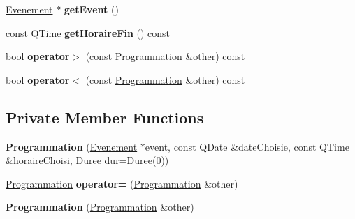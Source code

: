 \begin{DoxyCompactItemize}
\item 
\hypertarget{class_programmation_afdb51dc8924974a73bc750096ae0151c}{}\hyperlink{class_evenement}{Evenement} $\ast$ {\bfseries get\+Event} ()\label{class_programmation_afdb51dc8924974a73bc750096ae0151c}

\item 
\hypertarget{class_programmation_a8a8e262d61a00c2e2d46c1aad7c895ff}{}const Q\+Time {\bfseries get\+Horaire\+Fin} () const \label{class_programmation_a8a8e262d61a00c2e2d46c1aad7c895ff}

\item 
\hypertarget{class_programmation_ae5e3c4dc5b6310e1b054a64b3eaee5fe}{}bool {\bfseries operator$>$} (const \hyperlink{class_programmation}{Programmation} \&other) const \label{class_programmation_ae5e3c4dc5b6310e1b054a64b3eaee5fe}

\item 
\hypertarget{class_programmation_a47bd954f67af45e8543efe792be05395}{}bool {\bfseries operator$<$} (const \hyperlink{class_programmation}{Programmation} \&other) const \label{class_programmation_a47bd954f67af45e8543efe792be05395}

\end{DoxyCompactItemize}
\subsection*{Private Member Functions}
\begin{DoxyCompactItemize}
\item 
\hypertarget{class_programmation_a7a32bea3ba1f02444f74dd38baaf9e8d}{}{\bfseries Programmation} (\hyperlink{class_evenement}{Evenement} $\ast$event, const Q\+Date \&date\+Choisie, const Q\+Time \&horaire\+Choisi, \hyperlink{class_duree}{Duree} dur=\hyperlink{class_duree}{Duree}(0))\label{class_programmation_a7a32bea3ba1f02444f74dd38baaf9e8d}

\item 
\hypertarget{class_programmation_ac999e116031fbc745dc32e0e6f8e2732}{}\hyperlink{class_programmation}{Programmation} {\bfseries operator=} (\hyperlink{class_programmation}{Programmation} \&other)\label{class_programmation_ac999e116031fbc745dc32e0e6f8e2732}

\item 
\hypertarget{class_programmation_ad6600e4dcea95c4f91e211b3a1700bce}{}{\bfseries Programmation} (\hyperlink{class_programmation}{Programmation} \&other)\label{class_programmation_ad6600e4dcea95c4f91e211b3a1700bce}

\end{DoxyCompactItemize}
